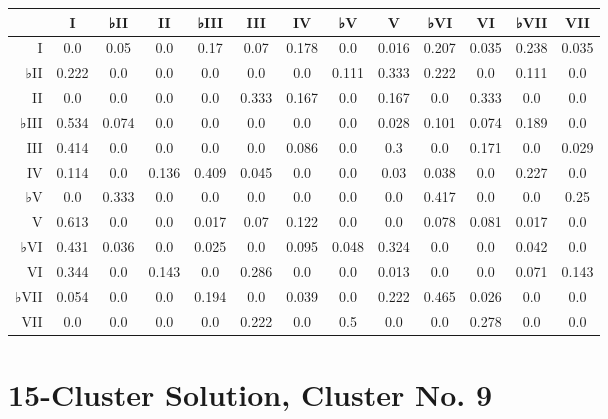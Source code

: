 \begin{table}[htbp]
\begin{minipage}{\linewidth}
\setlength{\tymax}{0.5\linewidth}
\centering
\small
\begin{tabulary}{\textwidth}{@{}RCCCCCCCCCCCC@{}} \toprule
&I&♭II&II&♭III&III&IV&♭V&V&♭VI&VI&♭VII&VII\\
\midrule
I&0.0&0.05&0.0&0.17&0.07&0.178&0.0&0.016&0.207&0.035&0.238&0.035\\
♭II&0.222&0.0&0.0&0.0&0.0&0.0&0.111&0.333&0.222&0.0&0.111&0.0\\
II&0.0&0.0&0.0&0.0&0.333&0.167&0.0&0.167&0.0&0.333&0.0&0.0\\
♭III&0.534&0.074&0.0&0.0&0.0&0.0&0.0&0.028&0.101&0.074&0.189&0.0\\
III&0.414&0.0&0.0&0.0&0.0&0.086&0.0&0.3&0.0&0.171&0.0&0.029\\
IV&0.114&0.0&0.136&0.409&0.045&0.0&0.0&0.03&0.038&0.0&0.227&0.0\\
♭V&0.0&0.333&0.0&0.0&0.0&0.0&0.0&0.0&0.417&0.0&0.0&0.25\\
V&0.613&0.0&0.0&0.017&0.07&0.122&0.0&0.0&0.078&0.081&0.017&0.0\\
♭VI&0.431&0.036&0.0&0.025&0.0&0.095&0.048&0.324&0.0&0.0&0.042&0.0\\
VI&0.344&0.0&0.143&0.0&0.286&0.0&0.0&0.013&0.0&0.0&0.071&0.143\\
♭VII&0.054&0.0&0.0&0.194&0.0&0.039&0.0&0.222&0.465&0.026&0.0&0.0\\
VII&0.0&0.0&0.0&0.0&0.222&0.0&0.5&0.0&0.0&0.278&0.0&0.0\\

\bottomrule

\end{tabulary}
\end{minipage}
\end{table}

\section{15-Cluster Solution, Cluster No. 9}
\label{15-clustersolutionclusterno.9}

